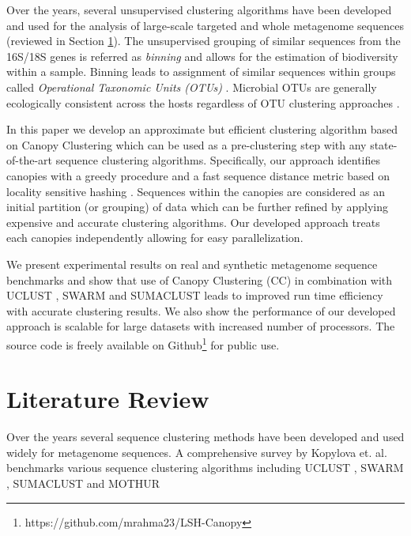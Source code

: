 \documentclass[10pt, conference, compsocconf]{IEEEtran}
\begin{document}
Over the years, several unsupervised clustering algorithms have been developed and used for the analysis of large-scale targeted and whole metagenome sequences (reviewed in Section \ref{sec:Literature}). The unsupervised grouping  of similar sequences from the 16S/18S genes is referred as \emph{binning} and allows for the estimation of biodiversity within a sample. Binning leads to assignment of similar sequences within groups called \emph{Operational Taxonomic Units (OTUs)} \cite{MAROTU}. Microbial OTUs are generally ecologically consistent across the hosts regardless of OTU clustering approaches \cite{MAROTUConsistant}. 


In this paper we develop an approximate but efficient clustering algorithm based on Canopy Clustering \cite{MARCanopy} which can be used as a pre-clustering  step with any state-of-the-art sequence clustering algorithms. Specifically, our approach identifies canopies with a greedy procedure and a fast sequence distance metric based on locality sensitive hashing \cite{MARLshRef2}. Sequences within the canopies are considered as an initial partition (or grouping) of data which can be further refined by applying expensive and accurate clustering algorithms. Our developed approach treats each canopies independently allowing for easy parallelization.

We present experimental results on real and synthetic metagenome sequence benchmarks and show that use of Canopy Clustering (CC) in combination with UCLUST \cite{MARuclust}, SWARM \cite{MARSwarm2} and SUMACLUST \cite{MARSumaclust} leads to improved run time efficiency with accurate clustering results. We also show the performance of our developed approach is scalable for large datasets with increased number of processors. The source code is freely available on Github\footnote{https://github.com/mrahma23/LSH-Canopy} for public use. 
          

\section{Literature Review}
\label{sec:Literature}

Over the years several sequence clustering methods have been developed and used widely for metagenome sequences. A comprehensive survey by Kopylova et. al. \cite{MARopenDeNovo} benchmarks various sequence clustering algorithms  including UCLUST \cite{MARuclust}, SWARM \cite{MARSwarm2}, SUMACLUST \cite{MARSumaclust} and MOTHUR \cite{MARMothur}
\end{document}
